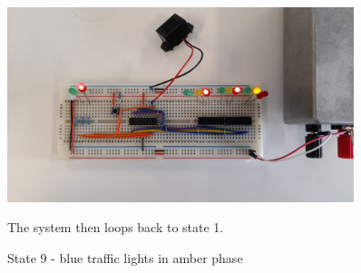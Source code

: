 \begin{figure}[H]
    \begin{minipage}{0.45\textwidth}
        \centering
        \includegraphics[width=0.9\textwidth]{images/final-testing/state_9.jpg}
        \caption{State 9 - blue traffic lights in amber phase}
        \label{fig:state_9}
    \end{minipage}\hfill
    \begin{minipage}{0.45\textwidth}
        \centering
        The system then loops back to state 1.
    \end{minipage}
\end{figure}

